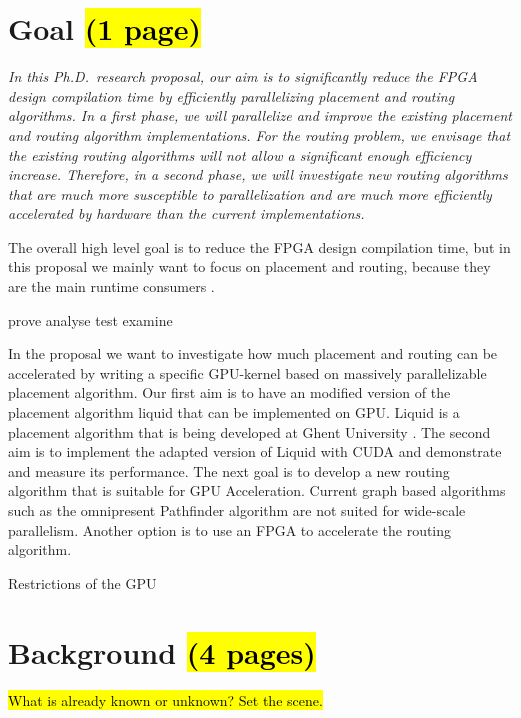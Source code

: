 \documentclass[a4paper,oneside,12pt]{article}
\begin{document}
\newpage

\section{Goal \hl{(1 page)}}

\emph{In this Ph.D.\ research proposal, our aim is to significantly reduce the FPGA design compilation time by efficiently parallelizing placement and routing algorithms. In a first phase, we will parallelize and improve the existing placement and routing algorithm implementations. For the routing problem, we envisage that the existing routing algorithms will not allow a significant enough efficiency increase. Therefore, in a second phase, we will investigate new routing algorithms that are much more susceptible to parallelization and are much more efficiently accelerated by hardware than the current implementations.}

The overall high level goal is to reduce the FPGA design compilation time, but in this proposal we mainly want to focus on placement and routing, because they are the main runtime consumers \cite{vansteenkiste2015analyzing}. 



prove
analyse
test
examine


In the proposal we want to investigate how much placement and routing can be accelerated by writing a specific GPU-kernel based on massively parallelizable placement algorithm.
Our first aim is to have an modified version of the placement algorithm liquid that can be implemented on GPU. Liquid is a placement algorithm that is being developed at Ghent University \cite{liquid}.  The second aim is to implement the adapted version of Liquid with CUDA \cite{nickolls2008scalable} and demonstrate and measure its performance. The next goal is to develop a new routing algorithm that is suitable for GPU Acceleration. Current graph based algorithms such as the omnipresent Pathfinder algorithm\cite{} are not suited for wide-scale parallelism. Another option is to use an FPGA to accelerate the routing algorithm.


Restrictions of the GPU



\newpage

\section{Background \hl{(4 pages)}}
\hl{What is already known or unknown? Set the scene.}
\end{document}
